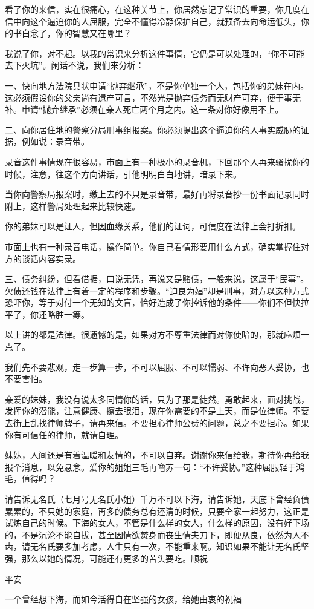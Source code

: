 \par {}
\par 看了你的来信，实在很痛心，在这种关节上，你居然忘记了常识的重要，你几度在信中向这个逼迫你的人屈服，完全不懂得冷静保护自己，就预备去向命运低头，你的书白念了，你的智慧又在哪里？
\par 我说了你，对不起。以我的常识来分析这件事情，它仍是可以处理的，“你不可能去下火坑”。闲话不说，我们来分析：
\par 一、快向地方法院具状申请“抛弃继承”，不是你单独一个人，包括你的弟妹在内。这必须假设你的父亲尚有遗产可言，不然光是抛弃债务而无财产可弃，便于事无补。申请“抛弃继承”必须在亲人死亡两个月之内。这一条对你好像用不上。
\par 二、向你居住地的警察分局刑事组报案。你必须提出这个逼迫你的人事实威胁的证据，例如说：录音带。
\par 录音这件事情现在很容易，市面上有一种极小的录音机，下回那个人再来骚扰你的时候，注意，往这个方向讲话，引他明明白白地讲，暗录下来。
\par 当你向警察局报案时，缴上去的不只是录音带，最好再将录音抄一份书面记录同时附上，这样警局处理起来比较快速。
\par 你的弟妹可以是证人，但因血缘关系，他们的证词，可信度在法律上会打折扣。
\par 市面上也有一种录音电话，操作简单。你自己看情形要用什么方式，确实掌握住对方的谈话内容实录。
\par 三、债务纠纷，但看借据，口说无凭，再说又是赌债，一般来说，这属于“民事”。欠债还钱在法律上有着一定的程序和步骤。“迫良为娼”却是刑事，对方以这种方式恐吓你，等于对付一个无知的文盲，恰好造成了你控诉他的条件——你们不但快拉平了，你还略胜一筹。
\par 以上讲的都是法律。很遗憾的是，如果对方不尊重法律而对你使暗的，那就麻烦一点了。
\par 我们先不要悲观，走一步算一步，不可以屈服、不可以懦弱、不许向恶人妥协，也不要害怕。
\par 亲爱的妹妹，我没有说太多同情你的话，只为了那是徒然。勇敢起来，面对挑战，发挥你的潜能，注意健康、擦去眼泪，现在你需要的不是上天，而是位律师。不要去街上乱找律师牌子，请再来信。不要担心律师公费的问题，总之不要担心。如果你有可信任的律师，就请自理。
\par 妹妹，人间还是有着温暖和友情的，不可以自弃。谢谢你来信给我，期待你再给我报个消息，以免悬念。爱你的姐姐三毛再噜苏一句：“不许妥协。”这种屈服轻于鸿毛，值得吗？
\par {}
\par {}
\par 请告诉无名氏（七月号无名氏小姐）千万不可以下海，请告诉她，天底下曾经负债累累的，不只她的家庭，再多的债务总有还清的时候，只要全家一起努力，这正是试炼自己的时候。下海的女人，不管是什么样的女人，什么样的原因，没有好下场的，不是沉沦不能自拔，甚至因情欲焚身而丧生情夫刀下，即便从良，依然为人不齿，请无名氏要多加考虑，人生只有一次，不能重来啊。知识如果不能让无名氏坚强，那么以她的情况，可能还有更多的苦头要吃。顺祝
\par 平安
\par 一个曾经想下海，而如今活得自在坚强的女孩，给她由衷的祝福
\par {}



